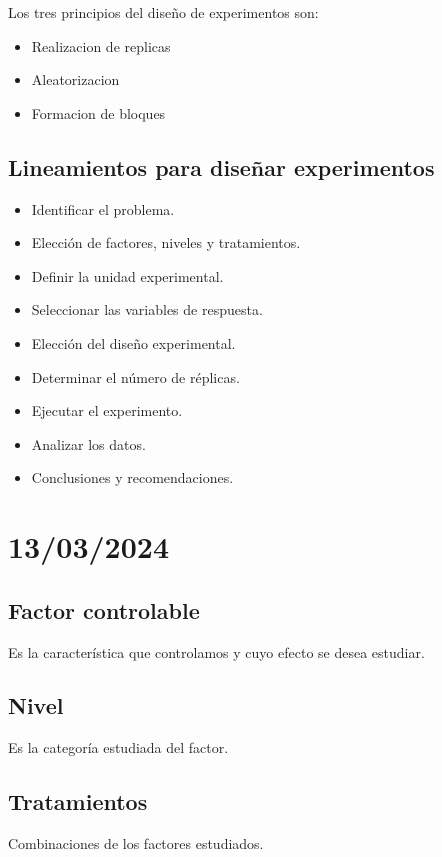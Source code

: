 \documentclass{article}
\begin{document}
Los tres principios del diseño de experimentos son:

\begin{itemize}
    \item Realizacion de replicas
    \item Aleatorizacion
    \item Formacion de bloques
\end{itemize}

\subsection*{Lineamientos para diseñar experimentos}

\begin{itemize}
    \item Identificar el problema.
    \item Elección de factores, niveles y tratamientos.
    \item Definir la unidad experimental.
    \item Seleccionar las variables de respuesta.
    \item Elección del diseño experimental.
    \item Determinar el número de réplicas.
    \item Ejecutar el experimento.
    \item Analizar los datos.
    \item Conclusiones y recomendaciones.
\end{itemize}

\section{13/03/2024}

\subsection*{Factor controlable}
Es la característica que controlamos y cuyo efecto se desea estudiar.

\subsection*{Nivel}
Es la categoría estudiada del factor.

\subsection*{Tratamientos}
Combinaciones de los factores estudiados.
\end{document}

